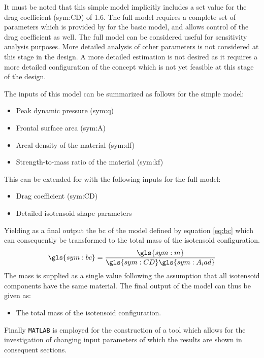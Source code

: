  It must be noted that this simple model implicitly includes a set value for the drag coefficient (\gls{sym:CD}) of 1.6. The full model requires a complete set of parameters which is provided by \cite{Anderson1969} for the basic model, and allows control of the drag coefficient as well. The full model can be considered useful for sensitivity analysis purposes. More detailed analysis of other parameters is not considered at this stage in the design. A more detailed estimation is not desired as it requires a more detailed configuration of the concept which is not yet feasible at this stage of the design.

The inputs of this model can be summarized as follows for the simple model:
\begin{itemize}
\item Peak dynamic pressure (\gls{sym:q})
\item Frontal surface area (\gls{sym:A})
\item Areal density of the material (\gls{sym:df})
\item Strength-to-mass ratio of the material (\gls{sym:kf})
\end{itemize}
This can be extended for with the following inputs for the full model:

\begin{itemize}
\item Drag coefficient (\gls{sym:CD})
\item Detailed isotensoid shape parameters
\end{itemize}

Yielding as a final output the \acrfull{bc} of the model defined by equation \ref{eq:bc} which can consequently be transformed to the total mass of the isotensoid configuration. 
\begin{equation}
\gls{sym:bc} = \frac{\gls{sym:m}}{\gls{sym:CD} \gls{sym:A_iad}}
\label{eq:bc}
\end{equation}
The mass is supplied as a single value following the assumption that all isotensoid components have the same material. The final output of the model can thus be given as:
\begin{itemize}
\item The total mass of the isotensoid configuration.
\end{itemize}
Finally \texttt{MATLAB} is employed for the construction of a tool which allows for the investigation of changing input parameters of which the results are shown in consequent sections.


